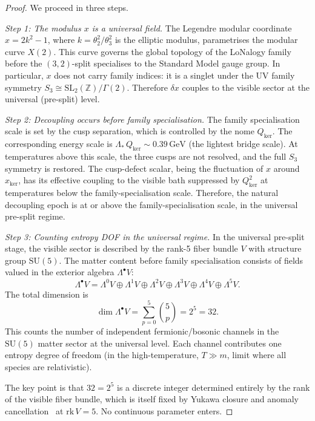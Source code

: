 \documentclass[12pt]{article}
\theoremstyle{plain}
\theoremstyle{definition}
\numberwithin{equation}{section}
\newcommand{\Z}{\mathbb{Z}}
\newcommand{\kker}{\mathrm{ker}}
\begin{document}
\begin{proof}
We proceed in three steps.

\emph{Step 1: The modulus $x$ is a universal field.}
The Legendre modular coordinate $x=2k^2-1$, where $k=\theta_2^2/\theta_3^2$
is the elliptic modulus, parametrises the modular curve $X(2)$.  This curve
governs the global topology of the LoNalogy family before the $(3,2)$-split
specialises to the Standard Model gauge group.  In particular, $x$ does not
carry family indices: it is a singlet under the UV family symmetry
$S_3\cong\mathrm{SL}_2(\Z)/\Gamma(2)$.  Therefore $\delta x$ couples to
the visible sector at the universal (pre-split) level.

\emph{Step 2: Decoupling occurs before family specialisation.}
The family specialisation scale is set by the cusp separation, which
is controlled by the nome $Q_{\kker}$.  The corresponding energy scale
is $\Lambda_*\,Q_{\kker}\sim0.39\,\mathrm{GeV}$ (the lightest bridge
scale).  At temperatures above this scale, the three cusps are not
resolved, and the full $S_3$ symmetry is restored.  The cusp-defect
scalar, being the fluctuation of $x$ around $x_{\kker}$, has its
effective coupling to the visible bath suppressed by $Q_{\kker}^2$
at temperatures below the family-specialisation scale.  Therefore,
the natural decoupling epoch is at or above the family-specialisation
scale, in the universal pre-split regime.

\emph{Step 3: Counting entropy DOF in the universal regime.}
In the universal pre-split stage, the visible sector is described by
the rank-5 fiber bundle $V$ with structure group $\mathrm{SU}(5)$.
The matter content before family specialisation consists of fields
valued in the exterior algebra $\Lambda^\bullet V$:
\begin{equation}
\Lambda^\bullet V = \Lambda^0 V\oplus\Lambda^1 V\oplus\Lambda^2 V
\oplus\Lambda^3 V\oplus\Lambda^4 V\oplus\Lambda^5 V.
\end{equation}
The total dimension is
\begin{equation}
\dim\Lambda^\bullet V = \sum_{p=0}^{5}\binom{5}{p} = 2^5 = 32.
\end{equation}
This counts the number of independent fermionic/bosonic channels in the
$\mathrm{SU}(5)$ matter sector at the universal level.  Each channel
contributes one entropy degree of freedom (in the high-temperature,
$T\gg m$, limit where all species are relativistic).

The key point is that $32=2^5$ is a discrete integer determined entirely
by the rank of the visible fiber bundle, which is itself fixed by Yukawa
closure and anomaly cancellation~\cite{YMmassGap} at $\mathrm{rk}\,V=5$.
No continuous parameter enters.
\end{proof}
\end{document}
